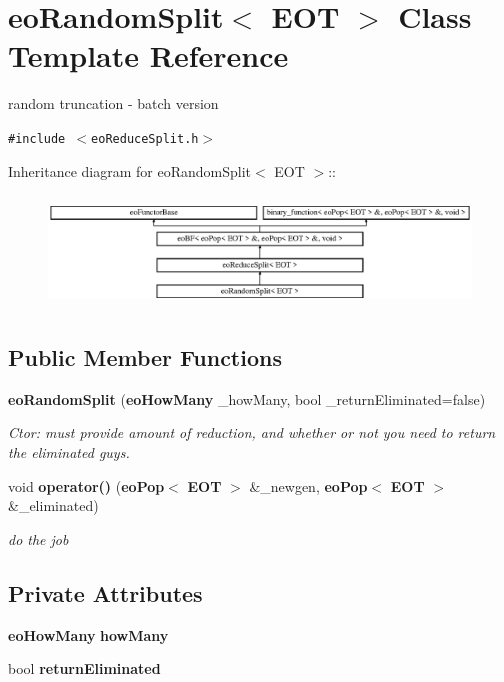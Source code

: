 \section{eo\-Random\-Split$<$ EOT $>$ Class Template Reference}
\label{classeo_random_split}
random truncation - batch version  


{\tt \#include $<$eo\-Reduce\-Split.h$>$}

Inheritance diagram for eo\-Random\-Split$<$ EOT $>$::\begin{figure}[H]
\begin{center}
\leavevmode
\includegraphics[height=3.01075cm]{classeo_random_split}
\end{center}
\end{figure}
\subsection*{Public Member Functions}
\begin{CompactItemize}
\item 
{\bf eo\-Random\-Split} ({\bf eo\-How\-Many} \_\-how\-Many, bool \_\-return\-Eliminated=false)\label{classeo_random_split_a0}

\begin{CompactList}\small\item\em Ctor: must provide amount of reduction, and whether or not you need to return the eliminated guys. \item\end{CompactList}\item 
void {\bf operator()} ({\bf eo\-Pop}$<$ {\bf EOT} $>$ \&\_\-newgen, {\bf eo\-Pop}$<$ {\bf EOT} $>$ \&\_\-eliminated)\label{classeo_random_split_a1}

\begin{CompactList}\small\item\em do the job \item\end{CompactList}\end{CompactItemize}
\subsection*{Private Attributes}
\begin{CompactItemize}
\item 
{\bf eo\-How\-Many} {\bf how\-Many}\label{classeo_random_split_r0}

\item 
bool {\bf return\-Eliminated}\label{classeo_random_split_r1}

\end{CompactItemize}



